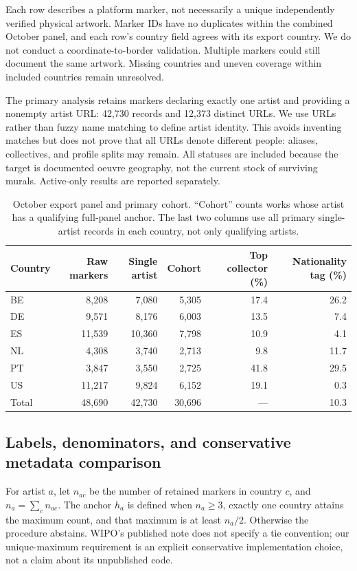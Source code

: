 Each row describes a platform marker, not necessarily a unique independently verified physical artwork. Marker IDs have no duplicates within the combined October panel, and each row's country field agrees with its export country. We do not conduct a coordinate-to-border validation. Multiple markers could still document the same artwork. Missing countries and uneven coverage within included countries remain unresolved.

The primary analysis retains markers declaring exactly one artist and providing a nonempty artist URL: 42,730 records and 12,373 distinct URLs. We use URLs rather than fuzzy name matching to define artist identity. This avoids inventing matches but does not prove that all URLs denote different people: aliases, collectives, and profile splits may remain. All statuses are included because the target is documented oeuvre geography, not the current stock of surviving murals. Active-only results are reported separately.

\begin{table}[t]
\caption{October export panel and primary cohort. ``Cohort'' counts works whose artist has a qualifying full-panel anchor. The last two columns use all primary single-artist records in each country, not only qualifying artists.}
\label{tab:data}\centering
\begin{tabular}{lrrrrr}\toprule
Country & Raw markers & Single artist & Cohort & Top collector (\%) & Nationality tag (\%)\\\midrule
BE & 8,208 & 7,080 & 5,305 & 17.4 & 26.2\\
DE & 9,571 & 8,176 & 6,003 & 13.5 & 7.4\\
ES & 11,539 & 10,360 & 7,798 & 10.9 & 4.1\\
NL & 4,308 & 3,740 & 2,713 & 9.8 & 11.7\\
PT & 3,847 & 3,550 & 2,725 & 41.8 & 29.5\\
US & 11,217 & 9,824 & 6,152 & 19.1 & 0.3\\\midrule
Total & 48,690 & 42,730 & 30,696 & --- & 10.3\\\bottomrule
\end{tabular}
\end{table}

\subsection{Labels, denominators, and conservative metadata comparison}
For artist $a$, let $n_{ac}$ be the number of retained markers in country $c$, and $n_a=\sum_c n_{ac}$. The anchor $h_a$ is defined when $n_a\geq3$, exactly one country attains the maximum count, and that maximum is at least $n_a/2$. Otherwise the procedure abstains. WIPO's published note does not specify a tie convention; our unique-maximum requirement is an explicit conservative implementation choice, not a claim about its unpublished code.

